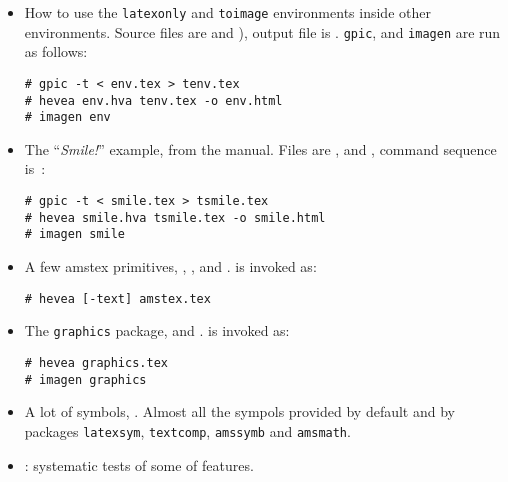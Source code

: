 \documentclass{article}
\begin{document}
\begin{itemize}
\item How to use the \verb+latexonly+ and \verb+toimage+ environments
inside other environments.
Source files are  and
), output file is .
\texttt{gpic}, \hevea{} and \texttt{imagen}
are run as follows:
\begin{verbatim}
# gpic -t < env.tex > tenv.tex
# hevea env.hva tenv.tex -o env.html
# imagen env
\end{verbatim}

\item The ``\emph{Smile!}'' example, from the manual.
Files are ,  and
, command sequence is~:
\begin{verbatim}
# gpic -t < smile.tex > tsmile.tex
# hevea smile.hva tsmile.tex -o smile.html
# imagen smile
\end{verbatim}

\item A few amstex primitives, ,
,  and .
\hevea{} is invoked as:
\begin{verbatim}
# hevea [-text] amstex.tex
\end{verbatim}

\item The \texttt{graphics} package, 
and .
\hevea{} is invoked as:
\begin{verbatim}
# hevea graphics.tex
# imagen graphics
\end{verbatim} 

\item A lot of symbols, .
Almost all the sympols provided by default and by packages
\texttt{latexsym},
\texttt{textcomp},
\texttt{amssymb} and \texttt{amsmath}.

\item {}: systematic tests of some of \hevea{} features.
\end{itemize}
\end{document}
